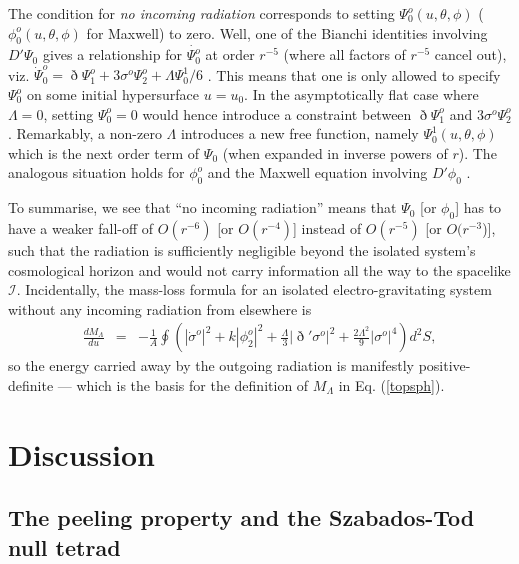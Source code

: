 \documentclass[aps,pre,preprint,superscriptaddress,showpacs,showkeys]{revtex4-1}
\begin{document}
The condition for \emph{no incoming radiation} corresponds to setting $\Psi^o_0(u,\theta,\phi)$ ($\phi^o_0(u,\theta,\phi)$ for Maxwell) to zero. Well, one of the Bianchi identities involving $D'\Psi_0$ gives a relationship for $\dot{\Psi^o_0}$ at order $r^{-5}$ (where all factors of $r^{-5}$ cancel out), viz. $\dot{\Psi}^o_0=\eth\Psi^o_1+3\sigma^o\Psi^o_2+\Lambda\Psi^1_0/6$ \cite{Vee2016}. This means that one is only allowed to specify $\Psi^o_0$ on some initial hypersurface $u=u_0$. In the asymptotically flat case where $\Lambda=0$, setting $\Psi^o_0=0$ would hence introduce a constraint between $\eth\Psi^o_1$ and $3\sigma^o\Psi^o_2$. Remarkably, a non-zero $\Lambda$ introduces a new free function, namely $\Psi^1_0(u,\theta,\phi)$ which is the next order term of $\Psi_0$ (when expanded in inverse powers of $r$). The analogous situation holds for $\phi^o_0$ and the Maxwell equation involving $D'\phi_0$ \cite{Vee2017}.

To summarise, we see that ``no incoming radiation'' means that $\Psi_0$ [or $\phi_0$] has to have a weaker fall-off of $O(r^{-6})$ [or $O(r^{-4})$] instead of $O(r^{-5})$ [or $O(r^{-3}$)], such that the radiation is sufficiently negligible beyond the isolated system's cosmological horizon and would not carry information all the way to the spacelike $\mathcal{I}$. Incidentally, the mass-loss formula for an isolated electro-gravitating system without any incoming radiation from elsewhere is
\begin{eqnarray}
\frac{dM_{\Lambda}}{du}
&=&-\frac{1}{A}\oint{\left(|\dot{\sigma}^o|^2+k|\phi^o_2|^2+\frac{\Lambda}{3}|\eth'\sigma^o|^2+\frac{2\Lambda^2}{9}|\sigma^o|^4\right)d^2S},\label{Bondimassloss}
\end{eqnarray}
so the energy carried away by the outgoing radiation is manifestly positive-definite --- which is the basis for the definition of $M_\Lambda$ in Eq. (\ref{topsph}).

\section{Discussion}\label{Section4}

\subsection{The peeling property and the Szabados-Tod null tetrad}\label{Section4A}
\end{document}
